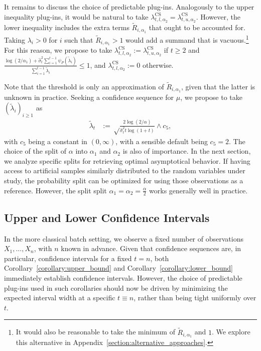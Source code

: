 It remains to discuss the choice of predictable plug-ins. Analogously to the upper inequality plug-ins, it would be natural to take $\lambda_{t,l, \alpha_2}^{\text{CS}} = \lambda_{t,u, \alpha_2}^{\text{CS}}$. However, the lower inequality includes the extra terms $\tilde R_{i, \alpha_1}$ that ought to be accounted for. Taking $\lambda_i > 0$ for $i$ such that $\tilde R_{i, \alpha_1} > 1$ would add a summand that is vacuous.\footnote{It would also be reasonable to take the minimum of $\tilde R_{i, \alpha_1}$ and $1$. We explore this alternative in Appendix~\ref{section:alternative_approaches}.} For this reason, we propose to take $\lambda_{t,l, \alpha_{2}}^{\text{CS}} := \lambda_{t,u, \alpha_{2}}^{\text{CS}}$ if $t \geq 2$ and $\frac{\log(2/\alpha_1) + \hat\sigma^2_{t} \sum_{i=1}^{t-1} \psi_P(\tilde \lambda_i)}{\sum_{i=1}^{t-1} \tilde \lambda_i} \leq 1$, and $\lambda_{t,l, \alpha_{2}}^{\text{CS}} := 0$ otherwise.

Note that the threshold is only an approximation of $\tilde R_{i, \alpha_1}$, given that the latter is unknown in practice. Seeking a confidence sequence for $\mu$, we propose to take $(\tilde\lambda_i)_{i \geq 1}$ as 
\begin{align} \label{eq:lambda_tilde_definition}
    \tilde \lambda_t &:= \sqrt\frac{2\log(2/\alpha)}{\widehat \sigma_{t}^2 t \log (1+t)} \wedge c_5,
\end{align}
with $c_5$ being a constant in $(0,\infty)$, with a sensible default being $c_5 =2$. The choice of the split of $\alpha$ into $\alpha_1$ and $\alpha_2$ is also of importance. In the next section, we analyze specific splits for retrieving optimal asymptotical behavior. If having access to artificial samples similarly distributed to the random variables under study, the probability split can be optimized for using those observations as a reference. However, the split split $\alpha_1 = \alpha_2 = \frac{\alpha}{2}$ works generally well in practice. 




\subsection{Upper and Lower Confidence Intervals} \label{section:ci}

In the more classical batch setting, we observe a fixed number of observations $X_1, \ldots, X_n$, with $n$ known in advance. Given that confidence sequences are, in particular, confidence intervals for a fixed $t=n$, both Corollary~\ref{corollary:upper_bound} 
and Corollary~\ref{corollary:lower_bound} immediately establish confidence intervals.  However, the choice of predictable plug-ins used in such corollaries should now be driven by minimizing the expected interval width  at a specific $t\equiv n$, rather than being tight uniformly over $t$. 

